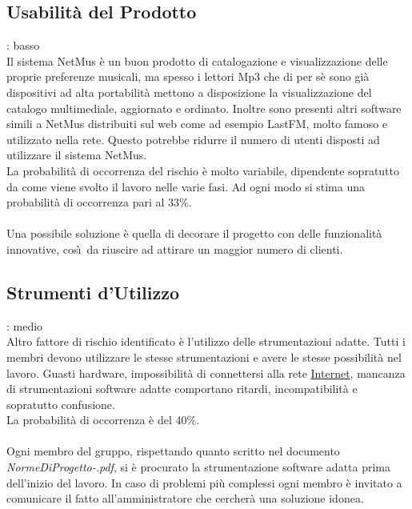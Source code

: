 \subsection{Usabilit\`a del Prodotto}
: basso\\
Il sistema NetMus \`e un buon prodotto di catalogazione e visualizzazione delle
proprie preferenze musicali, ma spesso i lettori Mp3 che di per s\`e sono gi\`a
dispositivi ad alta portabilit\`a mettono a disposizione la visualizzazione del
catalogo multimediale, aggiornato e ordinato. Inoltre sono presenti altri
software simili a NetMus distribuiti sul web come ad esempio LastFM, molto
famoso e utilizzato nella rete. Questo potrebbe ridurre il numero di utenti disposti
ad utilizzare il sistema NetMus.\\
La probabilit\`a di occorrenza del rischio \`e molto variabile, dipendente
sopratutto da come viene svolto il lavoro nelle varie fasi. Ad ogni modo si
stima una probabilit\`a di occorrenza pari al 33\%.\\
\\
Una possibile soluzione \`e quella di decorare il progetto con delle
funzionalit\`a innovative, cos\`\i\ da riuscire ad attirare un maggior numero di clienti.

\subsection{Strumenti d'Utilizzo}
: medio\\
Altro fattore di rischio identificato \`e l'utilizzo delle strumentazioni adatte. 
Tutti i membri devono utilizzare le stesse strumentazioni e avere le stesse possibilit\`a nel lavoro. 
Guasti hardware, impossibilit\`a di connettersi alla rete \underline{Internet},
mancanza di strumentazioni software adatte comportano ritardi, incompatibilit\`a e sopratutto confusione. \\
La probabilit\`a di occorrenza \`e del 40\%.\\
\\
Ogni membro del gruppo, 
rispettando quanto scritto nel documento
\emph{NormeDiProgetto-\versionenormeprogetto.pdf}, si \`e procurato la
strumentazione software adatta prima dell'inizio del lavoro. In caso di problemi
pi\`u complessi ogni membro \`e invitato a comunicare il fatto
all'amministratore che cercher\`a una soluzione idonea.

